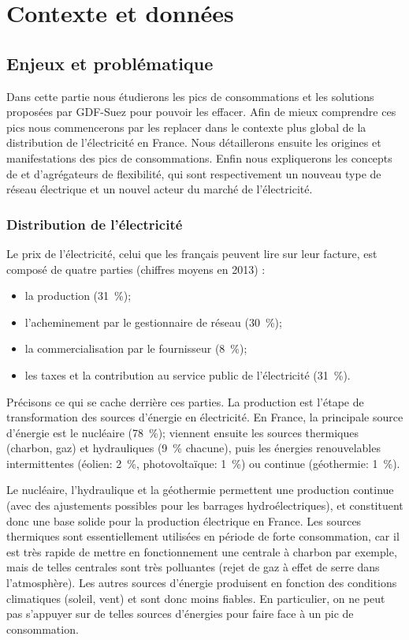 \section{Contexte et données}

	\subsection{Enjeux et problématique}
	
	Dans cette partie nous étudierons les pics de consommations et les solutions proposées par GDF-Suez pour pouvoir les effacer. Afin de mieux comprendre ces pics nous commencerons par les replacer dans le contexte plus global de la distribution de l'électricité en France. Nous détaillerons ensuite les origines et manifestations des pics de consommations. Enfin nous expliquerons les concepts de \smartgrid{} et d'agrégateurs de flexibilité, qui sont respectivement un nouveau type de réseau électrique et un nouvel acteur du marché de l'électricité.
		
		\subsubsection{Distribution de l'électricité}
		
			Le prix de l'électricité, celui que les français peuvent lire sur leur facture, est composé de quatre parties (chiffres moyens en 2013) :
			\begin{itemize}
				\item la production (\SI{31}{\percent});
				\item l'acheminement par le gestionnaire de réseau (\SI{30}{\percent});
				\item la commercialisation par le fournisseur (\SI{8}{\percent});
				\item les taxes et la contribution au service public de l'électricité (\SI{31}{\percent}).
			\end{itemize}
			
			Précisons ce qui se cache derrière ces parties.
			La production est l'étape de transformation des sources d'énergie en électricité.
			En France, la principale source d'énergie est le nucléaire (\SI{78}{\percent}); viennent ensuite les sources thermiques (charbon, gaz) et hydrauliques (\SI{9}{\percent} chacune), puis les énergies renouvelables intermittentes (éolien: \SI{2}{\percent}, photovoltaïque: \SI{1}{\percent}) ou continue (géothermie: \SI{1}{\percent}).
			
			Le nucléaire, l'hydraulique et la géothermie permettent une production continue (avec des ajustements possibles pour les barrages hydroélectriques), et constituent donc une base solide pour la production électrique en France. Les sources thermiques sont essentiellement utilisées en période de forte consommation, car il est très rapide de mettre en fonctionnement une centrale à charbon par exemple, mais de telles centrales sont très polluantes (rejet de gaz à effet de serre dans l'atmosphère). Les autres sources d'énergie produisent en fonction des conditions climatiques (soleil, vent) et sont donc moins fiables. En particulier, on ne peut pas s'appuyer sur de telles sources d'énergies pour faire face à un pic de consommation.
			
